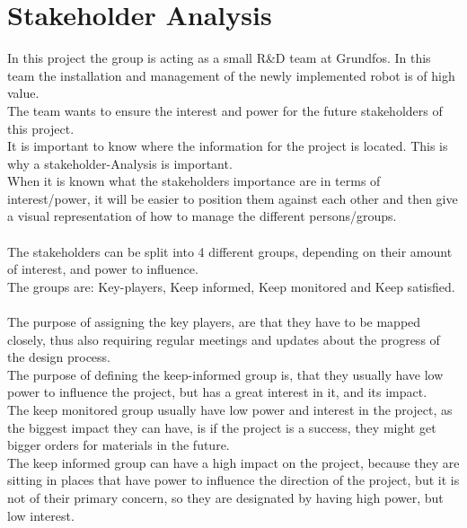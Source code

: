 \chapter{Stakeholder Analysis} \label{ch:Stakeholder Analysis}

In this project the group is acting as a small R\&D team at Grundfos. In this team the installation and management of the newly implemented robot is of high value.\\
The team wants to ensure the interest and power for the future stakeholders of this project.\\
It is important to know where the information for the project is located. This is why a stakeholder-Analysis is important.\\
When it is known what the stakeholders importance are in terms of interest/power, it will be easier to position them against each other and then give a visual representation of how to manage the different persons/groups.\\
\\
The stakeholders can be split into 4 different groups, depending on their amount of interest, and power to influence.\\
The groups are: Key-players, Keep informed, Keep monitored and Keep satisfied.\\
\\
The purpose of assigning the key players, are that they have to be mapped closely, thus also requiring regular meetings and updates about the progress of the design process.\\
The purpose of defining the keep-informed group is, that they usually have low power to influence the project, but has a great interest in it, and its impact.\\
The keep monitored group usually have low power and interest in the project, as the biggest impact they can have, is if the project is a success, they might get bigger orders for materials in the future.\\
The keep informed group can have a high impact on the project, because they are sitting in places that have power to influence the direction of the project, but it is not of their primary concern, so they are designated by having high power, but low interest.\\




